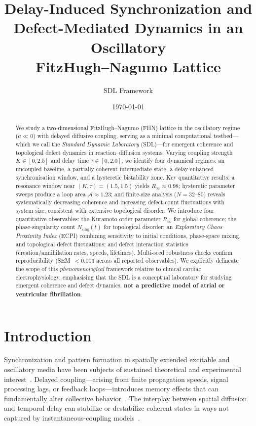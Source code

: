 \documentclass[11pt,a4paper]{article}
\title{\textbf{Delay-Induced Synchronization and\\
Defect-Mediated Dynamics in an Oscillatory\\
FitzHugh--Nagumo Lattice}}
\author{SDL Framework}
\date{\today}
\begin{document}
\maketitle

\begin{abstract}
We study a two-dimensional FitzHugh--Nagumo (FHN) lattice in the
oscillatory regime ($a \ll 0$) with delayed diffusive coupling,
serving as a minimal computational testbed---which we call the
\textit{Standard Dynamic Laboratory} (SDL)---for emergent
coherence and topological defect dynamics in reaction--diffusion
systems.
%
Varying coupling strength $K \in [0, 2.5]$ and delay time
$\tau \in [0, 2.0]$, we identify four dynamical regimes:
an uncoupled baseline, a partially coherent intermediate state,
a delay-enhanced synchronisation window, and a hysteretic
bistability zone.
%
Key quantitative results: a resonance window near
$(K,\tau)=(1.5,1.5)$ yields $R_\infty \approx 0.98$;
hysteretic parameter sweeps produce a loop area
$\mathcal{A}\approx 1.23$; and finite-size analysis
($N=32$--$80$) reveals systematically decreasing coherence
and increasing defect-count fluctuations with system size,
consistent with extensive topological disorder.
%
We introduce four quantitative observables:
the Kuramoto order parameter $R_\infty$ for global coherence;
the phase-singularity count $N_{\text{sing}}(t)$ for topological
disorder;
an \textit{Exploratory Chaos Proximity Index} (ECPI) combining
sensitivity to initial conditions, phase-space mixing, and
topological defect fluctuations;
and defect interaction statistics (creation/annihilation rates,
speeds, lifetimes).
%
Multi-seed robustness checks confirm reproducibility
(SEM~$<0.003$ across all reported observables).
%
We explicitly delineate the scope of this \textit{phenomenological}
framework relative to clinical cardiac electrophysiology,
emphasising that the SDL is a conceptual laboratory for studying
emergent coherence and defect dynamics, \textbf{not a predictive
model of atrial or ventricular fibrillation}.
\end{abstract}

\section{Introduction}

Synchronization and pattern formation in spatially extended
excitable and oscillatory media have been subjects of sustained
theoretical and experimental
interest~\cite{Winfree1987,Cross1993,Kuramoto1984}.
Delayed coupling---arising from finite propagation speeds, signal
processing lags, or feedback loops---introduces memory effects
that can fundamentally alter collective
behavior~\cite{Schuster1989,Yeung1999,Atay2004}.
The interplay between spatial diffusion and temporal delay can
stabilize or destabilize coherent states in ways not captured by
instantaneous-coupling
models~\cite{Nakamura1994,Kim1997,Flunkert2010}.
\end{document}
